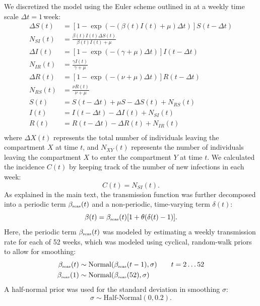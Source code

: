 \documentclass[12pt]{article}
\newcommand{\tsub}[2]{#1_{{\textrm{\tiny #2}}}}
\begin{document}
We discretized the model using the Euler scheme outlined in \cite{he2010plug} at a weekly time scale $\Delta t = 1\,\mathrm{week}$:
\begin{align}
\Delta S(t) &= \left[1- \exp(-(\beta(t) I(t) + \mu) \Delta t )\right] S(t-\Delta t)\\
N_{SI}(t) &= \frac{\beta(t) I(t)\Delta S(t)}{\beta(t) I(t) + \mu} \\
\Delta I(t) &= \left[1- \exp(-(\gamma + \mu) \Delta t )\right] I(t-\Delta t)\\
N_{IR}(t) &= \frac{\gamma I(t)}{\gamma + \mu} \\
\Delta R(t) &= \left[1- \exp(-(\nu + \mu) \Delta t )\right] R(t-\Delta t)\\
N_{RS}(t) &= \frac{\nu R(t)}{\nu + \mu} \\
S(t) &= S(t-\Delta t) + \mu S - \Delta S(t) + N_{RS}(t)  \\
I(t) &= I(t-\Delta t) - \Delta I(t) + N_{SI}(t)  \\
R(t) &= R(t-\Delta t) - \Delta R(t) + N_{IR}(t)  \\
\end{align}
where $\Delta X(t)$ represents the total number of individuals leaving the compartment $X$ at time $t$,
and $N_{XY}(t)$ represents the number of individuals leaving the compartment $X$ to enter the compartment $Y$ at time $t$.
We calculated the incidence $C(t)$ by keeping track of the number of new infections in each week:
\begin{equation}
C(t) = N_{SI}(t).
\end{equation}
As explained in the main text, the transmission function was further decomposed into a periodic term $\tsub{\beta}{seas}(t)$ and a non-periodic, time-varying term $\delta(t)$:
\begin{equation}
\beta(t) = \tsub{\beta}{seas}(t) [1+\theta (\delta(t)-1)].
\end{equation}
Here, the periodic term $\tsub{\beta}{seas}(t)$ was modeled by estimating a weekly transmission rate for each of 52 weeks, which was modeled using cyclical, random-walk priors to allow for smoothing:
\begin{align}
\tsub{\beta}{seas}(t) &\sim \mathrm{Normal}(\tsub{\beta}{seas}(t-1), \sigma) \qquad t = 2 \dots 52\\
\tsub{\beta}{seas}(1) &\sim \mathrm{Normal}(\tsub{\beta}{seas}(52), \sigma)
\end{align}
A half-normal prior was used for the standard deviation in smoothing $\sigma$:
\begin{equation}
\sigma \sim \textrm{Half-Normal}(0, 0.2).
\end{equation}
\end{document}
